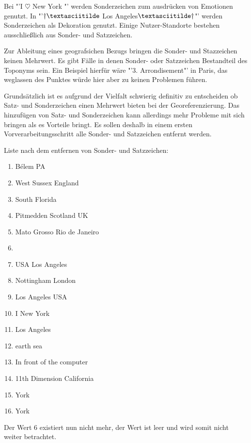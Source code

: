 				Bei "'I $\heartsuit$ New York "' werden Sonderzeichen zum ausdrücken von Emotionen genutzt.
				In "'$\dagger\textasciitilde$ Los Angeles$\textasciitilde\dagger$"' werden Sonderzeichen als Dekoration genutzt.
				Einige Nutzer-Standorte bestehen ausschließlich aus Sonder- und Satzzeichen.

				Zur Ableitung eines geografsichen Bezugs bringen die Sonder- und Stazzeichen keinen Mehrwert.
				Es gibt Fälle in denen Sonder- oder Satzzeichen Bestandteil des Toponyms sein.
				Ein Beispiel hierfür wäre "'3. Arrondisement"' in Paris, das weglassen des Punktes würde hier aber zu keinen Problemen führen.
				
				Grundsätzlich ist es aufgrund der Vielfalt schwierig definitiv zu entscheiden ob Satz- und Sonderzeichen einen Mehrwert bieten bei der Georeferenzierung. 
				Das hinzufügen von Satz- und Sonderzeichen kann allerdings mehr Probleme mit sich bringen als es Vorteile bringt.
				Es sollen deshalb in einem ersten Vorverarbeitungsschritt alle Sonder- und Satzzeichen entfernt werden. 

				Liste nach dem entfernen von Sonder- und Satzzeichen:

				\begin{multicols}{2}
					\begin{enumerate}
						\item Bélem PA
						\item West Sussex England
						\item South Florida
						\item Pitmedden Scotland UK
						\item Mato Grosso Rio de Janeiro
						\item 
						\item USA Los Angeles
						\item Nottingham London
						\item Los Angeles USA
						\item I New York 
						\item Los Angeles
						\item earth sea
						\item In front of the computer
						\item 11th Dimension California
						\item York
						\item York
					\end{enumerate}
				\end{multicols}

				Der Wert 6 existiert nun nicht mehr, der Wert ist leer und wird somit nicht weiter betrachtet.

